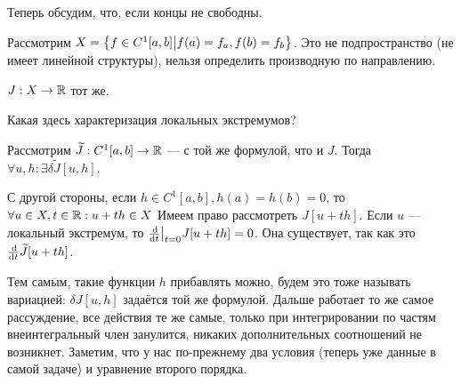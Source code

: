 \documentclass[a4paper]{report}
\begin{document}
    Теперь обсудим, что, если концы не свободны.

    Рассмотрим $X = \left\{f \in C^1[a, b]\middle|f(a) = f_a, f(b) = f_b\right\}$. Это не подпространство (не имеет линейной структуры), нельзя определить производную по направлению.

    $J: X \rightarrow \mathbb{R}$ тот же.

    Какая здесь характеризация локальных экстремумов?

    Рассмотрим $\widetilde{J}: C^1[a, b] \rightarrow \mathbb{R}$ --- с той же формулой, что и $J$. Тогда $\forall u, h: \exists \delta\tilde{J}[u, h]$.

    С другой стороны, если $h \in C^1[a, b], h(a) = h(b) = 0$, то $\forall u \in X, t \in \mathbb{R}: u + th \in X$
    Имеем право рассмотреть $J[u + th]$. Если $u$ --- локальный экстремум, то $\frac{\operatorname{d}\! }{\operatorname{d}\! t}\big|_{t = 0}J[u + th] = 0$.
    Она существует, так как это $\frac{\operatorname{d}\!}{\operatorname{d}\! t}\widetilde{J}[u + th]$.

    Тем самым, такие функции $h$ прибавлять можно, будем это тоже называть вариацией: $\delta J[u, h]$ задаётся той же формулой.
    Дальше работает то же самое рассуждение, все действия те же самые, только при интегрировании по частям внеинтегральный член занулится, никаких дополнительных соотношений не возникнет.
    Заметим, что у нас по-прежнему два условия (теперь уже данные в самой задаче) и уравнение второго порядка.
\end{document}
